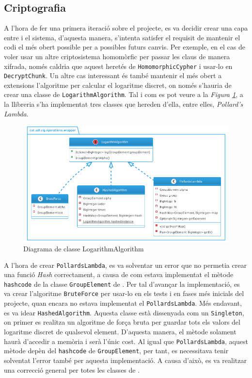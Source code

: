 \subsection{Criptografia}
A l'hora de fer una primera iteració sobre el projecte, es va decidir crear una capa entre \ciglib i el sistema, d'aquesta manera, s'intenta satisfer el requisit de mantenir el codi el més obert possible per a possibles futurs canvis. Per exemple, en el cas de voler usar un altre criptosistema homomòrfic per passar les claus de manera xifrada, només caldria que aquest heretés de \texttt{HomomorphicCypher} i usar-lo en \texttt{DecryptChunk}. Un altre cas interessant és també mantenir el més obert a extensions l'algoritme per calcular el logaritme discret, on només s'hauria de crear una classe de \texttt{LogarithmAlgorithm}. Tal i com es pot veure a la \textit{Figura \ref{fig:logarithm}}, a la llibreria \cite{ciglib} s'ha implementat tres classes que hereden d'ella, entre elles, \textit{Pollard's Lambda}.
\begin{figure}[H]
	\centering
	\includegraphics[width=16cm]{classes/log.png}
	\caption{Diagrama de classe LogarithmAlgorithm}
	\label{fig:logarithm}
\end{figure}
A l'hora de crear \texttt{PollardsLambda}, es va solventar un error que no permetia crear una funció \textit{Hash} correctament, a causa de com estava implementat el mètode \texttt{hashcode} de la classe \texttt{GroupElement} de \cite{ciglib}. Per tal d'avançar la implementació, es va crear l'algoritme \texttt{BruteForce} per usar-lo en els tests i en fases més inicials del projecte, quan encara no estava implementat el \texttt{PollardsLambda}. Més endavant, es va idear \texttt{HashedAlgorithm}. Aquesta classe està dissenyada com un \texttt{Singleton}, on primer es realitza un algoritme de força bruta per guardar tots els valors del logaritme discret de qualsevol element. D'aquesta manera, el mètode solament haurà d'accedir a memòria i serà l'únic cost. Al igual que \texttt{PollardsLambda}, aquest mètode depèn del \texttt{hashcode} de \texttt{GroupElement}, per tant, es necessitava tenir solventat l'error també per aquesta implementació. A causa d'això, es va realitzar una correcció general per totes les classes de \cite{ciglib}.
